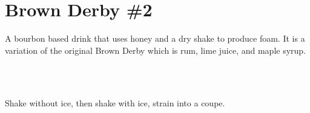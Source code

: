 \section[Brown Derby \#2]{Brown Derby \#2}


\begin{recipestats}[
	servings=1,
	preptime=5 \minute,
	source=,
	original=\citefield{cocktailSeminars2021}{title} \cite{cocktailSeminars2021},
]
\end{recipestats}


\begin{recipeabstract}
	A bourbon based drink that uses honey and a dry shake to produce foam.
	It is a variation of the original Brown Derby which is rum, lime juice, and maple syrup.
\end{recipeabstract}


\begin{ingredientcolumns}[1]
	\begin{ingredientblock}
		\\
		\\
	\end{ingredientblock}
\end{ingredientcolumns}


\begin{preparation}
\item Shake without ice, then shake with ice, strain into a coupe.
\end{preparation}


\recipeend
